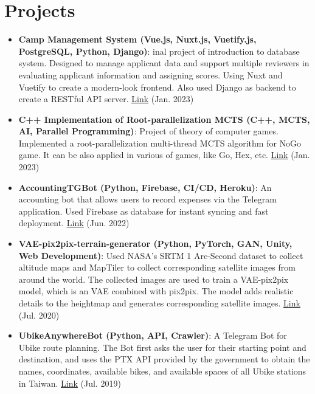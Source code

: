 \documentclass[a4paper,10pt]{extarticle}
\newcommand{\resumeItem}[2]{
  \item\small{
    \textbf{#1}{: #2 \vspace{-2pt}}
  }
}
\newcommand{\resumeSubItem}[2]{\resumeItem{#1}{#2}\vspace{-3pt}}
\newcommand{\resumeSubHeadingListStart}{\begin{itemize}[leftmargin=*]}
\newcommand{\resumeSubHeadingListEnd}{\end{itemize}}
\begin{document}
\section{Projects}
\resumeSubHeadingListStart
\setlength\itemsep{0.25em}
\resumeSubItem{Camp Management System (Vue.js, Nuxt.js, Vuetify.js, PostgreSQL, Python, Django)}{inal project of introduction to database system. Designed to manage applicant data and support multiple reviewers in evaluating applicant information and assigning scores. Using Nuxt and Vuetify to create a modern-look frontend. Also used Django as backend to create a RESTful API server. \href{https://github.com/jayin92/camp-management-system}{\underline{Link}} (Jan. 2023)}
\resumeSubItem{C++ Implementation of Root-parallelization MCTS (C++, MCTS, AI, Parallel Programming)}{Project of theory of computer games. Implemented a root-parallelization multi-thread MCTS algorithm for NoGo game. It can be also applied in various of games, like Go, Hex, etc. \href{https://github.com/jayin92/NYCU-theory-of-computer-games/tree/main/project3/code}{\underline{Link}} (Jan. 2023)}
\resumeSubItem{AccountingTGBot (Python, Firebase, CI/CD, Heroku)}{An accounting bot that allows users to record expenses via the Telegram application. Used Firebase as database for instant syncing and fast deployment.  \href{https://github.com/jayin92/AccountingTGBot}{\underline{Link}} (Jun. 2022)}
\vspace{2pt}
\resumeSubItem{VAE-pix2pix-terrain-generator (Python, PyTorch, GAN, Unity, Web Development)}{Used NASA's SRTM 1 Arc-Second dataset to collect altitude maps and MapTiler to collect corresponding satellite images from around the world. The collected images are used to train a VAE-pix2pix model, which is an VAE combined with pix2pix. The model adds realistic details to the heightmap and generates corresponding satellite images. 
 \href{https://github.com/jayin92/pix2pix-terrain-generator}{\underline{Link}} (Jul. 2020)}
\vspace{2pt}
\resumeSubItem{UbikeAnywhereBot (Python, API, Crawler)}{A Telegram Bot for Ubike route planning. The Bot first asks the user for their starting point and destination, and uses the PTX API provided by the government to obtain the names, coordinates, available bikes, and available spaces of all Ubike stations in Taiwan. 
 \href{https://github.com/jayin92/UBikeAnywhereBot}{\underline{Link}} (Jul. 2019)}
\resumeSubHeadingListEnd
\end{document}
